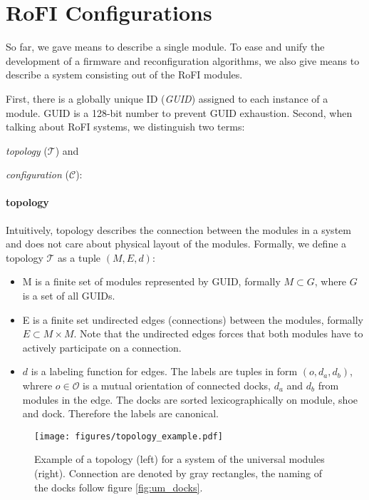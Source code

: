 \section{RoFI Configurations} \label{sec:configuration}

So far, we gave means to describe a single module. To ease and unify the
development of a firmware and reconfiguration algorithms, we also give means to
describe a system consisting out of the RoFI modules.

First, there is a globally unique ID (\emph{GUID}) assigned to each instance of
a module. GUID is a 128-bit number to prevent GUID exhaustion. Second, when
talking about RoFI systems, we distinguish two terms:
\begin{enumerate*}
    \item \emph{topology} ($\mathcal{T}$) and
    \item \emph{configuration} ($\mathcal{C}$):
\end{enumerate*}

\paragraph{topology} Intuitively, topology describes the connection between the
modules in a system and does not care about physical layout of the modules.
Formally, we define a topology $\mathcal{T}$ as a tuple $(M, E, d)$:
\begin{itemize}
    \item M is a finite set of modules represented by GUID, formally $M\subset
    G$, where $G$ is a set of all GUIDs.
    \item E is a finite set undirected edges (connections) between the modules,
    formally $E\subset M\times M$. Note that the undirected edges forces that
    both modules have to actively participate on a connection.
    \item $d$ is a labeling function for edges. The labels are tuples in form
    $(o, d_a, d_b)$, whrere $o\in\mathcal{O}$ is a mutual orientation of
    connected docks, $d_a$ and $d_b$ from modules in the edge. The docks are
    sorted lexicographically on module, shoe and dock. Therefore the labels are
    canonical.
\end{itemize}

\begin{figure}[h!]
    \centering
    \texttt{[image: figures/topology\_example.pdf]}
    \caption{Example of a topology (left) for a system of the universal modules
    (right). Connection are denoted by gray rectangles, the naming of the docks
    follow figure \ref{fig:um_docks}. }
    \label{fig:topology_example}
\end{figure}

